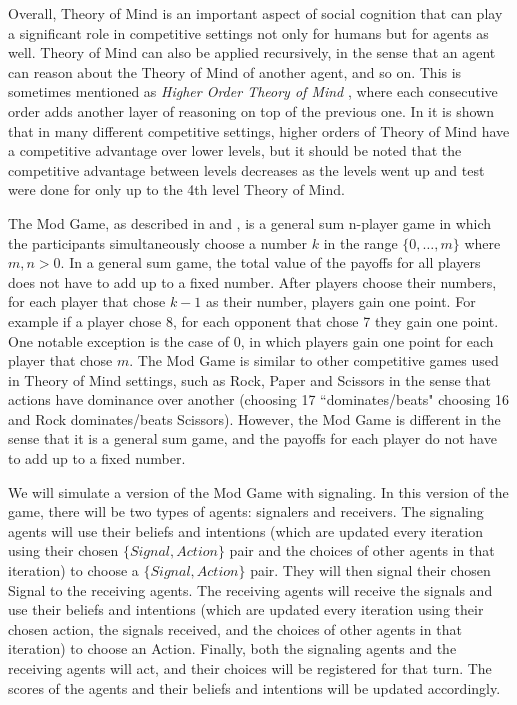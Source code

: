 Overall, Theory of Mind is an important aspect of social cognition that can play a significant role in competitive settings not only for humans but for agents as well. Theory of Mind can also be applied recursively, in the sense that an agent can reason about the Theory of Mind of another agent, and so on. This is sometimes mentioned as \textit{Higher Order Theory of Mind} \citep{de2017negotiating}, where each consecutive order adds another layer of reasoning on top of the previous one. In \cite{de2013much} it is shown that in many different competitive settings, higher orders of Theory of Mind have a competitive advantage over lower levels, but it should be noted that the competitive advantage between levels decreases as the levels went up and test were done for only up to the 4th level Theory of Mind.

The Mod Game, as described in \cite{frey2013cyclic} and \cite{veltman2019training}, is a general sum n-player game in which the participants simultaneously choose a number $k$ in the range $\{0, …, m\}$ where $m, n > 0$. In a general sum game, the total value of the payoffs for all players does not have to add up to a fixed number. After players choose their numbers, for each player that chose $k - 1$ as their number, players gain one point. For example if a player chose 8, for each opponent that chose 7 they gain one point. One notable exception is the case of 0, in which players gain one point for each player that chose $m$. The Mod Game is similar to other competitive games used in Theory of Mind settings, such as Rock, Paper and Scissors in the sense that actions have dominance over another (choosing 17 ``dominates/beats" choosing 16 and Rock dominates/beats Scissors). However, the Mod Game is different in the sense that it is a general sum game, and the payoffs for each player do not have to add up to a fixed number.

We will simulate a version of the Mod Game with signaling. In this version of the game, there will be two types of agents: signalers and receivers. The signaling agents will use their beliefs and intentions (which are updated every iteration using their chosen $\{Signal, Action\}$ pair and the choices of other agents in that iteration) to choose a $\{Signal, Action\}$ pair. They will then signal their chosen Signal to the receiving agents. The receiving agents will receive the signals and use their beliefs and intentions (which are updated every iteration using their chosen action, the signals received, and the choices of other agents in that iteration) to choose an Action. Finally, both the signaling agents and the receiving agents will act, and their choices will be registered for that turn. The scores of the agents and their beliefs and intentions will be updated accordingly.

